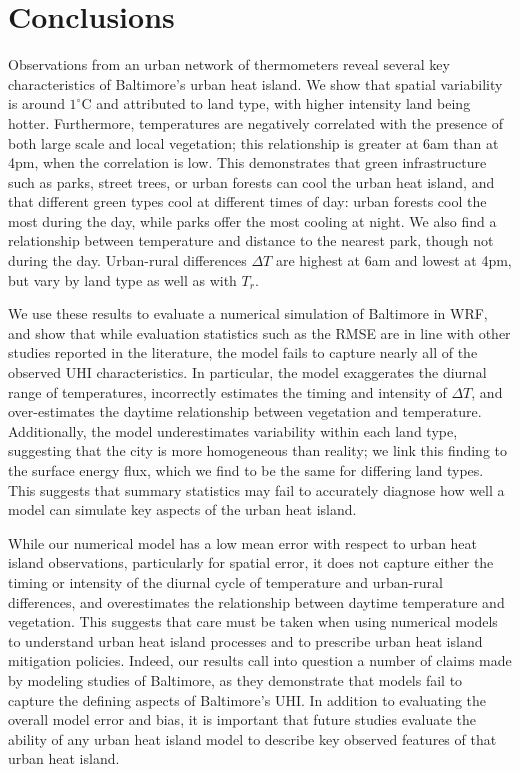 \section{Conclusions}\label{sec:conclusions}
Observations from an urban network of thermometers reveal several key characteristics of Baltimore's urban heat island. We show that spatial variability is around $1^\circ$C and attributed to land type, with higher intensity land being hotter. Furthermore, temperatures are negatively correlated with the presence of both large scale and local vegetation; this relationship is greater at 6am than at 4pm, when the correlation is low.  This demonstrates that green infrastructure such as parks, street trees, or urban forests can cool the urban heat island, and that different green types cool at different times of day: urban forests cool the most during the day, while parks offer the most cooling at night. 
We also find a relationship between temperature and distance to the nearest park, though not during the day. Urban-rural differences $\Delta T$ are highest at 6am and lowest at 4pm, but vary by land type as well as with $T_r$.

 We use these results to evaluate a numerical simulation of Baltimore in WRF, and show that while evaluation statistics such as the RMSE are in line with other studies reported in the literature, the model fails to capture nearly all of the observed UHI characteristics. In particular, the model exaggerates the diurnal range of temperatures, incorrectly estimates the timing and intensity of $\Delta T$, and over-estimates the daytime relationship between vegetation and temperature. Additionally, the model underestimates variability within each land type, suggesting that the city is more homogeneous than reality; we link this finding to the surface energy flux, which we find to be the same for differing land types. This suggests that summary statistics may fail to accurately diagnose how well a model can simulate key aspects of the urban heat island. 


While our numerical model has a low mean error with respect to urban heat island observations, particularly for spatial error, it does not capture either the timing or intensity of the diurnal cycle of temperature and urban-rural differences, and overestimates the relationship between daytime temperature and vegetation. This suggests that care must be taken when using numerical models to understand urban heat island processes and to prescribe urban heat island mitigation policies. Indeed, our results call into question a number of claims made by modeling studies of Baltimore, as they demonstrate that models fail to capture the defining aspects of Baltimore's UHI. In addition to evaluating the overall model error and bias, it is important that future studies evaluate the ability of any urban heat island model to describe key observed features of that urban heat island. 

